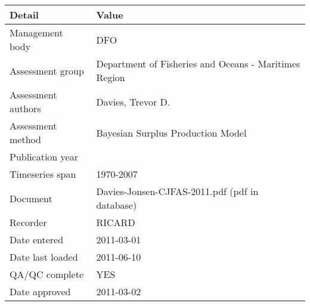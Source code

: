 \begin{table}[htb]
\centering
\begin{tabular}{lp{7cm}}
\toprule
Detail & Value \\
\midrule
Management body    & DFO                                                   \\
Assessment group   & Department of Fisheries and Oceans - Maritimes Region \\
Assessment authors & Davies, Trevor D.                                     \\
Assessment method  & Bayesian Surplus Production Model                     \\
Publication year   &                                                       \\
Timeseries span    & 1970-2007                                             \\
Document           & Davies-Jonsen-CJFAS-2011.pdf (pdf in database)        \\
Recorder           & RICARD                                                \\
Date entered       & 2011-03-01                                            \\
Date last loaded   & 2011-06-10                                            \\
QA/QC complete     & YES                                                   \\
Date approved      & 2011-03-02                                            \\
\bottomrule
\end{tabular}
\label{tab:assessdet}
\end{table}
